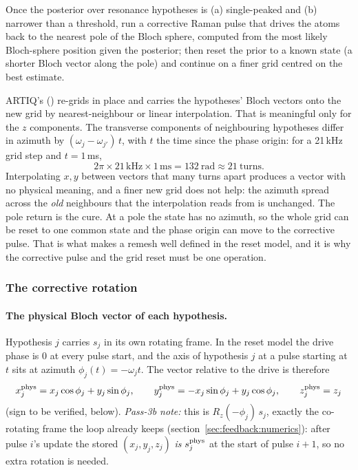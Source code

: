 Once the posterior over resonance hypotheses is (a) single-peaked and (b)
narrower than a threshold, run a corrective Raman pulse that drives the atoms
back to the nearest pole of the Bloch sphere, computed from the most likely
Bloch-sphere position given the posterior; then reset the prior to a known
state (a shorter Bloch vector along the pole) and continue on a finer grid
centred on the best estimate.

ARTIQ's  () re-grids in
place and carries the hypotheses' Bloch vectors onto the new grid by
nearest-neighbour or linear interpolation. That is meaningful only for the
$z$ components. The transverse components of neighbouring hypotheses differ in
azimuth by $(\omega_j - \omega_{j'})\,t$, with $t$ the time since the phase
origin: for a 21\,kHz grid step and $t = 1$\,ms,
\[
  2\pi \times 21\,\mathrm{kHz} \times 1\,\mathrm{ms} = 132\ \mathrm{rad} \approx 21\ \text{turns}.
\]
Interpolating $x, y$ between vectors that many turns apart produces a vector
with no physical meaning, and a finer new grid does not help: the azimuth
spread across the \emph{old} neighbours that the interpolation reads from is
unchanged. The pole return is the cure. At a pole the state has no azimuth,
so the whole grid can be reset to one common state and the phase origin can
move to the corrective pulse. That is what makes a remesh well defined in the
reset model, and it is why the corrective pulse and the grid reset must be one
operation.

\subsubsection{The corrective rotation}

\paragraph{The physical Bloch vector of each hypothesis.} Hypothesis $j$
carries $s_j$ in its own rotating frame. In the reset model the drive phase is
0 at every pulse start, and the axis of hypothesis $j$ at a pulse starting at
$t$ sits at azimuth $\phi_j(t) = -\omega_j t$. The vector relative to the drive is
therefore
\[
  x_j^{\rm phys} = x_j\cos\phi_j + y_j\sin\phi_j,\qquad
  y_j^{\rm phys} = -x_j\sin\phi_j + y_j\cos\phi_j,\qquad
  z_j^{\rm phys} = z_j
\]
(sign to be verified, below). \emph{Pass-3b note:} this is $R_z(-\phi_j)\,s_j$,
exactly the co-rotating frame the loop already keeps
(section~\ref{sec:feedback:numerics}): after pulse $i$'s update the stored
$(x_j, y_j, z_j)$ \emph{is} $s_j^{\rm phys}$ at the start of pulse $i+1$, so no
extra rotation is needed.

